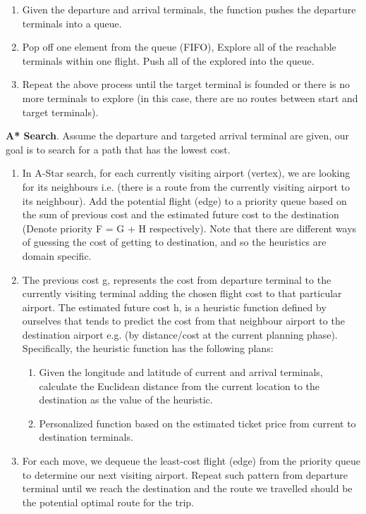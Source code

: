 \documentclass[fontsize=11pt]{article}
\begin{document}
\begin{enumerate}
    \begin{enumerate}
        \item Given the departure and arrival terminals, the function pushes the departure terminals into a queue.
        \item Pop off one element from the queue (FIFO), Explore all of the reachable terminals within one flight. Push all of the explored into the queue.
        \item Repeat the above process until the target terminal is founded or there is no more terminals to explore (in this case, there are no routes between start and target terminals).
    \end{enumerate}
    \textbf{A* Search}. Assume the departure and targeted arrival terminal are given, our goal is to search for a path that has the lowest cost.\cite{astar}
    \begin{enumerate}
        \item In A-Star search, for each currently visiting airport (vertex), we are looking for its neighbours i.e. (there is a route from the currently visiting airport to its neighbour). Add the potential flight (edge) to a priority queue based on the sum of previous cost and the estimated future cost to the destination (Denote priority F = G + H respectively). Note that there are different ways of guessing the cost of getting to destination, and so the heuristics are domain specific.
        \item The previous cost g, represents the cost from departure terminal to the currently visiting terminal adding the chosen flight cost to that particular airport. The estimated future cost h, is a heuristic function defined by ourselves that tends to predict the cost from that neighbour airport to the destination airport e.g. (by distance/cost at the current planning phase). Specifically, the heuristic function has the following plans: 
        \begin{enumerate}
            \item Given the longitude and latitude of current and arrival terminals, calculate the Euclidean distance from the current location to the destination as the value of the heuristic.
            \item Personalized function based on the estimated ticket price from current to destination terminals.
        \end{enumerate}
        \item For each move, we dequeue the least-cost flight (edge) from the priority queue to determine our next visiting airport. Repeat such pattern from departure terminal until we reach the destination and the route we travelled should be the potential optimal route for the trip. 

\end{enumerate}
\end{enumerate}
\end{document}
